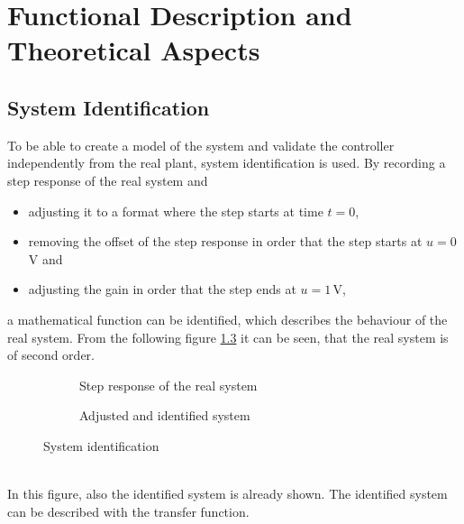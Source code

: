 \chapter{Functional Description and Theoretical Aspects}
\label{chapter:func_descr_and_theor_aspects}

\section{System Identification}
\label{sec:sys_ident}
To be able to create a model of the system and validate the controller independently from the real plant, system identification is used. By recording a step response of the real system and 
\begin{itemize}
    \item adjusting it to a format where the step starts at time $t=0$, 
    \item removing the offset of the step response in order that the step starts at $u=0\,$V and
    \item adjusting the gain in order that the step ends at $u=1\,$V, 
\end{itemize}
a mathematical function can be identified, which describes the behaviour of the real system. 
From the following figure \ref{fig:sys_id} it can be seen, that the real system is of second order. 
\begin{figure}[!h]
\centering
    \begin{subfigure}{.5\textwidth}
      \centering
      
      \caption{Step response of the real system}
      \label{fig:ser}
    \end{subfigure}%
    \begin{subfigure}{.5\textwidth}
      \centering
      
      \caption{Adjusted and identified system}
      \label{fig:par}
    \end{subfigure}
    \caption{System identification}
    \label{fig:sys_id}
\end{figure}
\\In this figure, also the identified system is already shown. The identified system can be described with the transfer function. 
